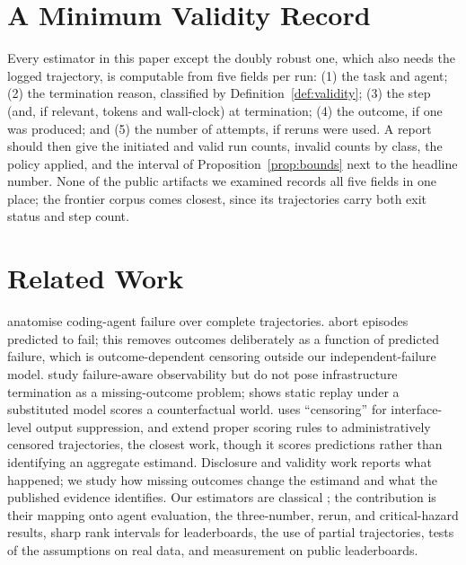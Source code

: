 \documentclass[11pt]{article}
\theoremstyle{definition}
\theoremstyle{remark}
\begin{document}
\section{A Minimum Validity Record}
\label{sec:practice}

Every estimator in this paper except the doubly robust one, which also needs
the logged trajectory, is computable from five fields per run:
(1) the task and agent; (2) the termination reason, classified by
Definition~\ref{def:validity}; (3) the step (and, if relevant, tokens and
wall-clock) at termination; (4) the outcome, if one was produced; and (5) the
number of attempts, if reruns were used. A report should then give the
initiated and valid run counts, invalid counts by class, the policy applied,
and the interval of Proposition~\ref{prop:bounds} next to the headline number.
None of the public artifacts we examined records all five fields in one place;
the frontier corpus comes closest, since its trajectories carry both exit status
and step count.

\section{Related Work}

\citet{zhao2026failure} anatomise coding-agent failure over complete
trajectories. \citet{ruan2026doomed} abort episodes predicted to fail; this
removes outcomes deliberately as a function of predicted failure, which is
outcome-dependent censoring outside our independent-failure model.
\citet{li2026early} study failure-aware observability but do not pose
infrastructure termination as a missing-outcome problem;
\citet{gonuguntla2026replay} shows static replay under a substituted model scores
a counterfactual world. \citet{wang2026interface} uses ``censoring'' for
interface-level output suppression, and \citet{raghu2026proper} extend proper
scoring rules to administratively censored trajectories, the closest work,
though it scores predictions rather than identifying an aggregate estimand.
Disclosure and validity work
\citep{kapoor2024agentsthatmatter,weidinger2025evalscience,zhu2026guardrails,chen2026judge,moghadasi2026disclose}
reports what happened; we study how missing outcomes change the estimand and
what the published evidence identifies. Our estimators are classical
\citep{horvitz1952generalization,kaplan1958nonparametric,manski1990nonparametric,robins1992recovery,robins1994estimation,bang2005doubly,scharfstein1999adjusting};
the contribution is their mapping onto agent evaluation, the three-number,
rerun, and critical-hazard results, sharp rank intervals for leaderboards, the
use of partial trajectories, tests of the assumptions on real data, and
measurement on public leaderboards.
\end{document}

